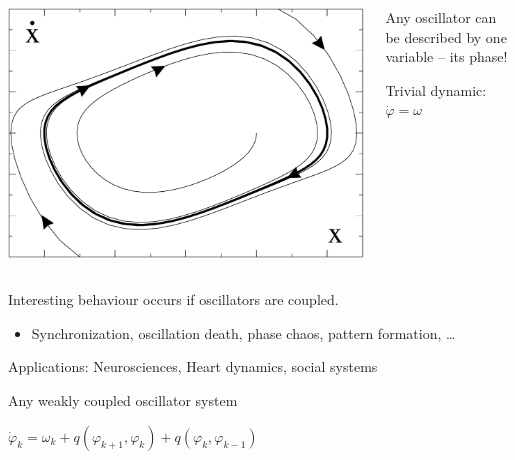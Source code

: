 \begin{frame}[fragile]

 \vspace{2ex}

 \begin{columns}[T]
  \begin{column}{0.35\textwidth}
   \includegraphics[draft=false,width=1.0\textwidth]{vdp.pdf}  
  \end{column}
  \begin{column}{0.63\textwidth}
 Any oscillator can be described by one variable -- its phase!

 \vspace{2ex}

 Trivial dynamic: $\dot{\varphi}=\omega$

  \end{column}
 \end{columns}

 \pause


 \vspace{2ex}

 Interesting behaviour occurs if oscillators are coupled.

 \begin{itemize}
  \item Synchronization, oscillation death, phase chaos, pattern formation, \dots
 \end{itemize}

 Applications: Neurosciences, Heart dynamics, social systems

 \vspace{2ex}

 Any weakly coupled oscillator system

 \vspace{1ex}

 \centerline{$\dot{\varphi}_k = \omega_k + q( \varphi_{k+1} , \varphi_k ) + q( \varphi_k , \varphi_{k-1} )$}

   
 
\end{frame}




